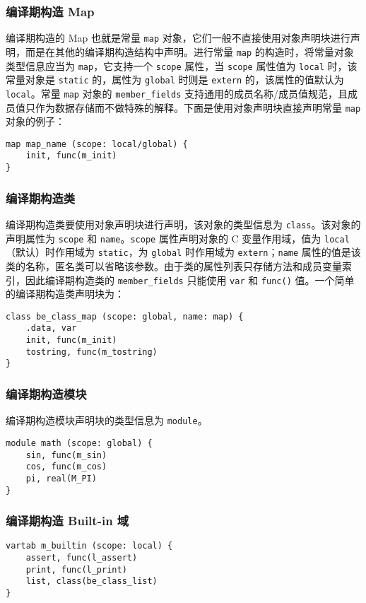 \subsubsection{编译期构造 Map}

编译期构造的 Map 也就是常量 \texttt{map} 对象，它们一般不直接使用对象声明块进行声明，而是在其他的编译期构造结构中声明。进行常量 \texttt{map} 的构造时，将常量对象类型信息应当为 \texttt{map}，它支持一个 \texttt{scope} 属性，当 \texttt{scope} 属性值为 \texttt{local} 时，该常量对象是 \texttt{static} 的，属性为 \texttt{global} 时则是 \texttt{extern} 的，该属性的值默认为 \texttt{local}。常量 \texttt{map} 对象的 \texttt{member\_fields} 支持通用的成员名称/成员值规范，且成员值只作为数据存储而不做特殊的解释。下面是使用对象声明块直接声明常量 \texttt{map} 对象的例子：
\begin{lstlisting}
map map_name (scope: local/global) {
    init, func(m_init)
}
\end{lstlisting}

\subsubsection{编译期构造类}

编译期构造类要使用对象声明块进行声明，该对象的类型信息为 \texttt{class}。该对象的声明属性为 \texttt{scope} 和 \texttt{name}。\texttt{scope} 属性声明对象的 C 变量作用域，值为 \texttt{local}（默认）时作用域为 \texttt{static}，为 \texttt{global} 时作用域为 \texttt{extern}；\texttt{name} 属性的值是该类的名称，匿名类可以省略该参数。由于类的属性列表只存储方法和成员变量索引，因此编译期构造类的 \texttt{member\_fields} 只能使用 \texttt{var} 和 \texttt{func()} 值。一个简单的编译期构造类声明块为：
\begin{lstlisting}
class be_class_map (scope: global, name: map) {
    .data, var
    init, func(m_init)
    tostring, func(m_tostring)
}
\end{lstlisting}

\subsubsection{编译期构造模块}

编译期构造模块声明块的类型信息为 \texttt{module}。

\begin{lstlisting}
module math (scope: global) {
    sin, func(m_sin)
    cos, func(m_cos)
    pi, real(M_PI)
}
\end{lstlisting}

\subsubsection{编译期构造 Built-in 域}

\begin{lstlisting}
vartab m_builtin (scope: local) {
    assert, func(l_assert)
    print, func(l_print)
    list, class(be_class_list)
}
\end{lstlisting}
